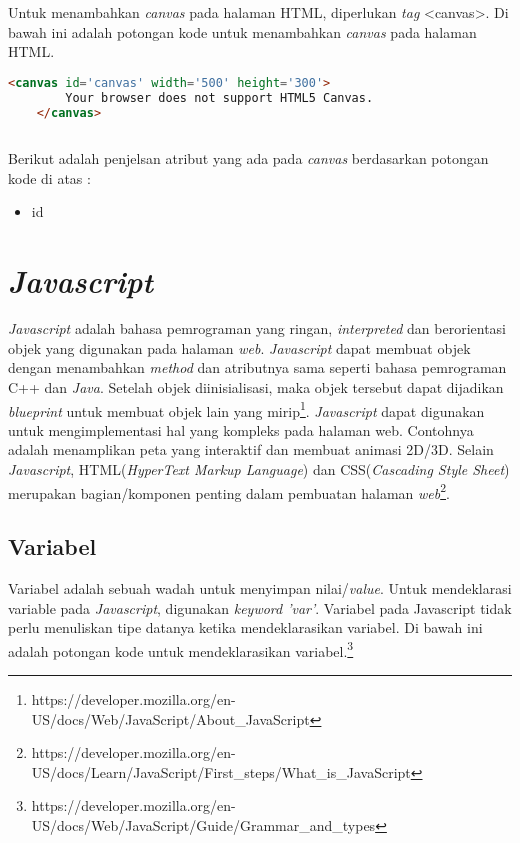 Untuk menambahkan \textit{canvas} pada halaman HTML, diperlukan \textit{tag} <canvas>. Di bawah ini adalah potongan kode untuk menambahkan \textit{canvas} pada halaman HTML. 

\begin{lstlisting}[language=HTML, caption=Menambahkan \textit{canvas}]
	<canvas id='canvas' width='500' height='300'>
		Your browser does not support HTML5 Canvas.
	</canvas>
	
\end{lstlisting}


Berikut adalah penjelsan atribut yang ada pada \textit{canvas} berdasarkan potongan kode di atas : 
\begin{itemize}
	\item id
\end{itemize}


\section{\textit{\textit{Javascript}}}
\label{sec:Javascript}
\textit{Javascript} adalah bahasa pemrograman yang ringan, \textit{interpreted} dan berorientasi objek yang digunakan pada halaman \textit{web}. \textit{Javascript} dapat membuat objek dengan menambahkan \textit{method} dan atributnya sama seperti bahasa pemrograman C++ dan \textit{Java}. Setelah objek diinisialisasi, maka objek tersebut dapat dijadikan \textit{blueprint} untuk membuat objek lain yang mirip\footnote{https://developer.mozilla.org/en-US/docs/Web/JavaScript/About\_JavaScript}. \textit{Javascript} dapat digunakan untuk mengimplementasi hal yang kompleks pada halaman web. Contohnya adalah menamplikan peta yang interaktif dan membuat animasi 2D/3D. Selain \textit{Javascript}, HTML(\textit{HyperText Markup Language}) dan CSS(\textit{Cascading Style Sheet}) merupakan bagian/komponen penting dalam pembuatan halaman \textit{web}\footnote{https://developer.mozilla.org/en-US/docs/Learn/JavaScript/First\_steps/What\_is\_JavaScript}.\\


\subsection{Variabel}
Variabel adalah sebuah wadah untuk menyimpan nilai/\textit{value}. Untuk mendeklarasi variable pada \textit{Javascript}, digunakan \textit{keyword 'var'}. Variabel pada Javascript tidak perlu menuliskan tipe datanya ketika mendeklarasikan variabel. Di bawah ini adalah potongan kode untuk mendeklarasikan variabel.\footnote{https://developer.mozilla.org/en-US/docs/Web/JavaScript/Guide/Grammar\_and\_types}

